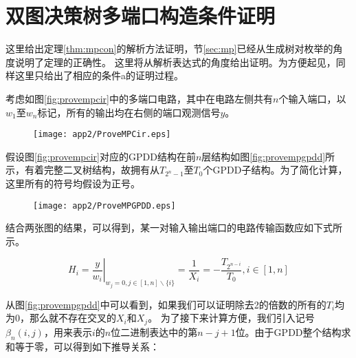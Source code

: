 \chapter{双图决策树多端口构造条件证明}
\label{app:mpcon}

这里给出定理\ref{thm:mpcon}的解析方法证明，节\ref{sec:mp}已经从生成树对枚举的角度说明了定理的正确性。
这里将从解析表达式的角度给出证明。为方便起见，同样这里只给出了相应的条件a的证明过程。

考虑如图\ref{fig:provempcir}中的多端口电路，其中在电路左侧共有$n$个输入端口，以$w_1$至$w_n$标记，所有的输出均在右侧的端口观测信号$y$。

\begin{figure}[!htp]
	\centering
	\texttt{[image: app2/ProveMPCir.eps]}
\end{figure}

假设图\ref{fig:provempcir}对应的GPDD结构在前$n$层结构如图\ref{fig:provempgpdd}所示，有着完整二叉树结构，故拥有从$T_{2^n-1}$至$T_0$个GPDD子结构。为了简化计算，这里所有的符号均假设为正号。

\begin{figure}[!htp]
	\centering
	\texttt{[image: app2/ProveMPGPDD.eps]}
\end{figure}

结合两张图的结果，可以得到，某一对输入输出端口的电路传输函数应如下式所示。

\begin{equation}
{H_i} = {\left. {\frac{y}
		{{{w_i}}}} \right|_{{w_j} = 0,j \in [1,n]\backslash \{ i\} }} = \frac{1}
{{{X_i}}} =  - \frac{{{T_{{2^{n - i}}}}}}
{{{T_0}}},i \in [1,n]
\end{equation}

从图\ref{fig:provempgpdd}中可以看到，如果我们可以证明除去2的倍数的所有的$T_i$均为0，那么就不存在交叉的$X_i$和$X_j$。
为了接下来计算方便，我们引入记号$\beta_n\left(i,j\right)$，用来表示$i$的$n$位二进制表达中的第$n-j+1$位。由于GPDD整个结构求和等于零，可以得到如下推导关系：

